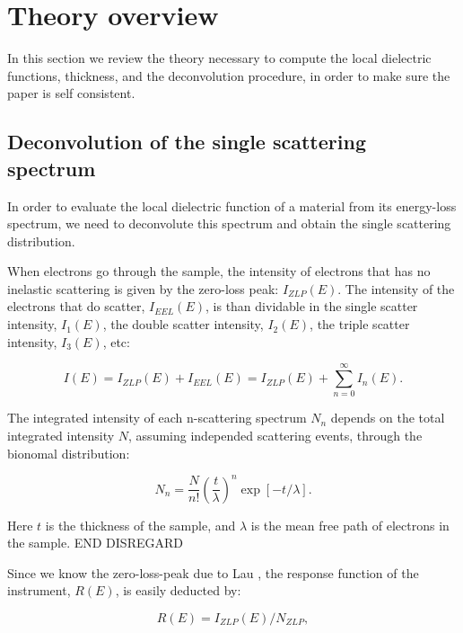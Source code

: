 
\section{Theory overview}
\label{sec:theory}

In this section we review the theory necessary
to compute the local dielectric functions, thickness,
and the deconvolution procedure, in order to make
sure the paper is self consistent.



\subsection{Deconvolution of the single scattering spectrum}

In order to evaluate the local dielectric function of
a material from its energy-loss spectrum, we need to deconvolute
this spectrum and obtain the single scattering distribution.


When electrons go through the sample, the intensity of electrons that has no inelastic scattering is given by the zero-loss peak: $I_{ZLP}(E)$. The intensity of the electrons that do scatter, $I_{EEL}(E)$, is than dividable in the single scatter intensity, $I_1(E)$, the double scatter intensity, $I_2(E)$, the triple scatter intensity, $I_3(E)$, etc:

\begin{equation}\label{eq_I}
    I(E) = I_{ZLP}(E) + I_{EEL}(E) = I_{ZLP}(E) + \sum_{n=0}^\infty I_n(E).
\end{equation}


The integrated intensity of each n-scattering spectrum $N_n$  depends on the total integrated intensity $N$, assuming independed scattering events, through the bionomal distribution:

\begin{equation}\label{eq_N_n}
    N_n =  \frac{N}{n!} \left(\frac{t}{\lambda}\right)^n \exp{[-t/\lambda]} .
\end{equation}

Here $t$ is the thickness of the sample, and $\lambda$ is the mean free path of electrons in the sample. 
END DISREGARD

Since we know the zero-loss-peak due to Lau \cite{lau}, the response function of the instrument, $R(E)$, is easily deducted by:

\begin{equation}
    R(E) = I_{ZLP}(E)/N_{ZLP},
\end{equation}

